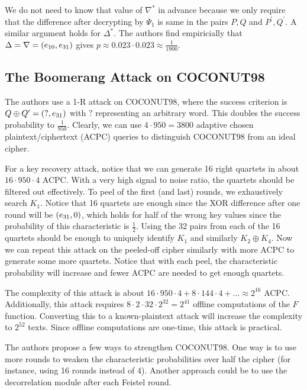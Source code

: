 \documentclass[twoside]{article}
\begin{document}
We do not need to know that value of \(\nabla^*\) in advance because we only
require that the difference after decrypting by \(\Psi_1\) is same in the pairs
\(P, Q\) and \(P^\prime, Q^\prime\). A similar argument holds for \(\Delta^*\).
The authors find empiricially that \(\Delta = \nabla = (e_{10}, e_{31})\)
gives \(p \approx 0.023 \cdot 0.023 \approx \frac{1}{1900}\).

\subsection{The Boomerang Attack on COCONUT98}
The authors use a 1-R attack on COCONUT98, where the success criterion is \(Q
\oplus Q^\prime = (?, e_{31})\) with \(?\) representing an arbitrary word.
This doubles the success probability to \(\frac{1}{950}\). Clearly, we can use
\(4 \cdot 950 = 3800\) adaptive chosen plaintext/ciphertext (ACPC) queries to
distinguish COCONUT98 from an ideal cipher.

For a key recovery attack, notice that we can generate 16 right quartets in
about \(16 \cdot 950 \cdot 4\) ACPC. With a very high signal to noise ratio, the
quartets should be filtered out effectively. To peel of the first (and last)
rounds, we exhaustively search \(K_1\). Notice that 16 quartets are enough since
the XOR difference after one round will be \((e_{31}, 0)\), which holds for
half of the wrong key values since the probability of this characteristic is
\(\frac{1}{2}\). Using the 32 pairs from each of the 16 quartets should be
enough to uniquely identify \(K_1\) and similarly \(K_2 \oplus K_4\). Now we can
repeat this attack on the peeled-off cipher similarly with more ACPC to generate
some more quartets. Notice that with each peel, the characteristic probability
will increase and fewer ACPC are needed to get enough quartets.

The complexity of this attack is about \(16 \cdot 950 \cdot 4 + 8 \cdot 144
\cdot 4 + \ldots \approx 2^{16}\) ACPC. Additionally, this attack requires \(8
\cdot 2 \cdot 32 \cdot 2^{32} = 2^{41}\) offline computations of the \(F\)
function. Converting this to a known-plaintext attack will increase the
complexity to \(2^{52}\) texts. Since offline computations are one-time, this
attack is practical.

The authors propose a few ways to strengthen COCONUT98. One way is to use more
rounds to weaken the characteristic probabilities over half the cipher (for
instance, using 16 rounds instead of 4). Another approach could be to use the
decorrelation module after each Feistel round.
\end{document}

